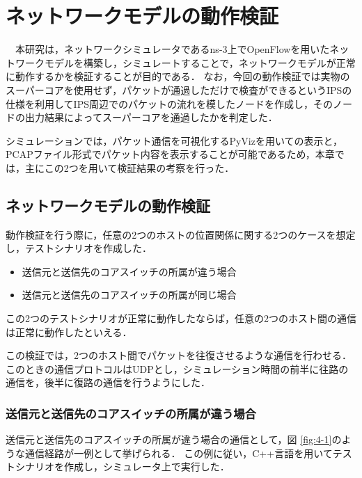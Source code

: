 \chapter{ネットワークモデルの動作検証}

　本研究は，ネットワークシミュレータであるns-3上でOpenFlowを用いたネットワークモデルを構築し，シミュレートすることで，ネットワークモデルが正常に動作するかを検証することが目的である．
なお，今回の動作検証では実物のスーパーコアを使用せず，パケットが通過しただけで検査ができるというIPSの仕様を利用してIPS周辺でのパケットの流れを模したノードを作成し，そのノードの出力結果によってスーパーコアを通過したかを判定した．

シミュレーションでは，パケット通信を可視化するPyVizを用いての表示と，PCAPファイル形式でパケット内容を表示することが可能であるため，本章では，主にこの2つを用いて検証結果の考察を行った．

\section{ネットワークモデルの動作検証}

動作検証を行う際に，任意の2つのホストの位置関係に関する2つのケースを想定し，テストシナリオを作成した．

\begin{itemize}
	\item 送信元と送信先のコアスイッチの所属が違う場合
	\item 送信元と送信先のコアスイッチの所属が同じ場合
\end{itemize}

この2つのテストシナリオが正常に動作したならば，任意の2つのホスト間の通信は正常に動作したといえる．

この検証では，2つのホスト間でパケットを往復させるような通信を行わせる．
このときの通信プロトコルはUDPとし，シミュレーション時間の前半に往路の通信を，後半に復路の通信を行うようにした．

\subsection{送信元と送信先のコアスイッチの所属が違う場合}

送信元と送信先のコアスイッチの所属が違う場合の通信として，図 \ref{fig:4-1}のような通信経路が一例として挙げられる．
この例に従い，C++言語を用いてテストシナリオを作成し，シミュレータ上で実行した．

